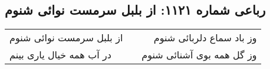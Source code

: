 \begin{center}
\section*{رباعی شماره ۱۱۲۱: از بلبل سرمست نوائی شنوم}
\label{sec:1121}
\begin{longtable}{l p{0.5cm} r}
از بلبل سرمست نوائی شنوم
&&
وز باد سماع دلربائی شنوم
\\
در آب همه خیال یاری بینم
&&
وز گل همه بوی آشنائی شنوم
\\
\end{longtable}
\end{center}
